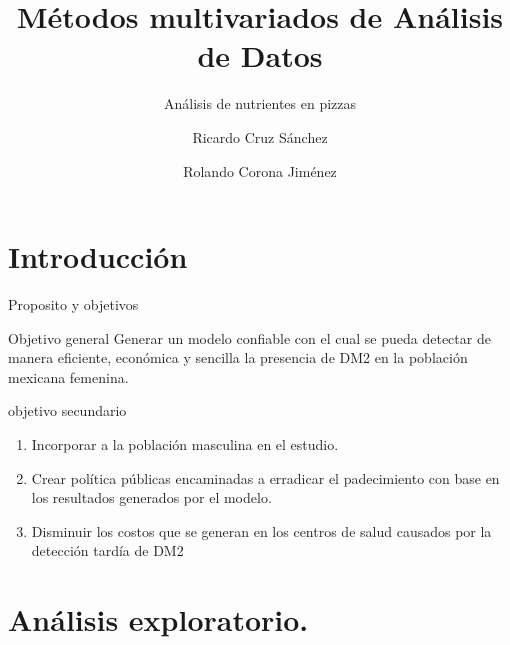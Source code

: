 \documentclass[pdf]{beamer}
\title{Métodos multivariados de Análisis de Datos}
\subtitle{Análisis de nutrientes en pizzas}
\author{
Ricardo Cruz Sánchez \\
  \and
Rolando Corona Jiménez
}
\institute[CIMAT]{CIMAT}
\begin{document}
\begin{frame}
\titlepage
\end{frame}




\section{Introducción}
\begin{frame}{Proposito y objetivos}
\begin{block}{Objetivo general}
Generar un modelo confiable con el cual se pueda detectar de manera eficiente, econ\'omica y sencilla la presencia de DM2 en la población mexicana femenina.
\end{block}

\begin{block}{objetivo secundario}
\begin{enumerate}
	\item Incorporar a la poblaci\'on masculina en el estudio.
	\item Crear política públicas encaminadas a erradicar el padecimiento con base en los resultados generados por el modelo.
	\item Disminuir los costos que se generan en los centros de salud causados por la detecci\'on tard\'ia de DM2
\end{enumerate}
\end{block}
\end{frame}

\section{Análisis exploratorio.}
\end{document}
